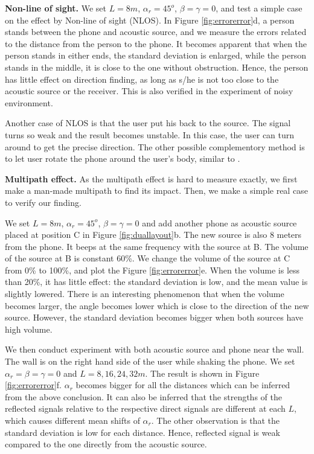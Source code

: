 \documentclass[]{sig-alternate-10pt}
\begin{document}
\noindent\textbf{Non-line of sight.}
 We set $L=8m$, $\alpha_r=45^o$, $\beta=\gamma=0$, and
 test a simple case on the effect by Non-line of sight (NLOS).  In
 Figure \ref{fig:errorerror}d, a person stands between the phone
 and acoustic source, and we measure the errors related to the
 distance from the person to the phone.
It becomes apparent that when the person
 stands in either ends, the standard deviation is enlarged, while the person stands
 in the middle, it is close to the one without
 obstruction.
Hence, the person has little effect on
 direction finding, as long as  s/he is not too close to the acoustic
 source or the receiver.
This is also verified in the experiment of noisy environment. 

Another case of NLOS is that the user put his back to the source. The
signal turns so weak and the result becomes unstable. In this case, the user can
turn around to get the precise direction. The other possible
complementory method is to let user rotate the phone around the user's
body, similar to \cite{2011-MOBICOM-Iamantenna}. 


\noindent\textbf{Multipath effect.} As the multipath effect is hard to
measure exactly, we first make a man-made multipath to find its
impact. Then, we make a simple real case to verify our finding.

We set $L=8m$, $\alpha_r=45^o$, $\beta=\gamma=0$ and add another
 phone as acoustic source placed at position C in
 Figure \ref{fig:duallayout}b.
The new source is also 8 meters from the phone. It beeps at the same
frequency with the source at B. The volume of the
source at B is constant 60\%.  We change the volume of the source at
C from 0\% to 100\%, and plot the Figure \ref{fig:errorerror}e.
When the volume is less than 20\%, it has little effect: the
standard deviation is low, and the mean value is slightly lowered.
There is an interesting phenomenon that when the volume becomes
larger, the angle becomes lower which is close to the direction of the
new source. However, the standard deviation becomes bigger when both
sources have high volume.

We then conduct experiment with both acoustic source and phone near the
wall. The wall is on the right hand side of the user while shaking the
phone.  We set $\alpha_r=\beta=\gamma=0$ and $L=8,16,24,32m$.
The result is shown in Figure \ref{fig:errorerror}f. $\alpha_r$
becomes bigger for all the distances which can be inferred from the
above conclusion. It can also be inferred that the strengths of
the reflected signals relative to the respective direct signals are different at each $L$, which causes different
mean shifts of $\alpha_r$.  The other observation is that the standard
deviation is low for each distance. Hence, reflected signal is weak
compared to the one directly from the acoustic source.
\end{document}
